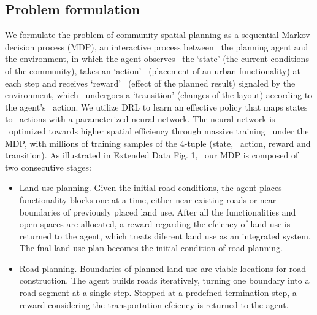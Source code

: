 \subsection{Problem formulation}
We formulate the problem of community spatial planning as a sequential Markov decision process (MDP), an interactive process between \
the planning agent and the environment, in which the agent observes \
the ‘state’ (the current conditions of the community), takes an ‘action’ \
(placement of an urban functionality) at each step and receives ‘reward’ \
(effect of the planned result) signaled by the environment, which \
undergoes a ‘transition’ (changes of the layout) according to the agent’s \
action. We utilize DRL to learn an effective policy that maps states to \
actions with a parameterized neural network. The neural network is \
optimized towards higher spatial efficiency through massive training \
under the MDP, with millions of training samples of the 4-tuple (state, \
action, reward and transition). As illustrated in Extended Data Fig. 1, \
our MDP is composed of two consecutive stages:

\begin{itemize}
    \item Land-use planning. Given the initial road conditions, the agent 
    places functionality blocks one at a time, either near existing 
    roads or near boundaries of previously placed land use. After 
    all the functionalities and open spaces are allocated, a reward 
    regarding the efciency of land use is returned to the agent, 
    which treats diferent land use as an integrated system. The fnal 
    land-use plan becomes the initial condition of road planning.
    \item Road planning. Boundaries of planned land use are viable locations for road construction. The agent builds roads iteratively, 
    turning one boundary into a road segment at a single step. 
    Stopped at a predefned termination step, a reward considering 
    the transportation efciency is returned to the agent.
\end{itemize}

